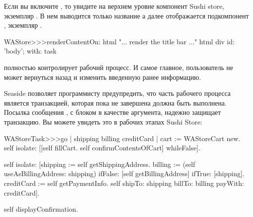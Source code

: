 \documentclass[a4paper,10pt,twoside]{book}
\begin{document}

Если вы включите , то увидите на верхнем уровне
компонент Sushi store, экземпляр .
В нем выводится только название а далее отображается подкомпонент
, экземпляр .

\begin{code}{}
WAStore>>>renderContentOn: html
	"... render the title bar ..."
	html div id: 'body'; with: task
\end{code}


 полностью контролирует рабочий процесс.
И самое главное, пользователь не может вернуться назад и изменить
введенную ранее информацию.



Seaside позволяет программисту предупредить,
что часть рабочего процесса является транзакцией,
которая пока не завершена должна быть выполнена.
Посылка сообщения ,
с блоком в качестве аргумента, надежно защищает транзакцию.
Вы можете увидеть это в рабочих этапах Sushi Store:

\begin{code}{}
WAStoreTask>>>go
	| shipping billing creditCard |
	cart := WAStoreCart new.
	self isolate:
		[[self fillCart.
		self confirmContentsOfCart]
			whileFalse].

	self isolate:
		[shipping := self getShippingAddress.
		billing := (self useAsBillingAddress: shipping)
					ifFalse: [self getBillingAddress]
					ifTrue: [shipping].
		creditCard := self getPaymentInfo.
		self shipTo: shipping billTo: billing payWith: creditCard].

	self displayConfirmation.
\end{code}
\end{document}
